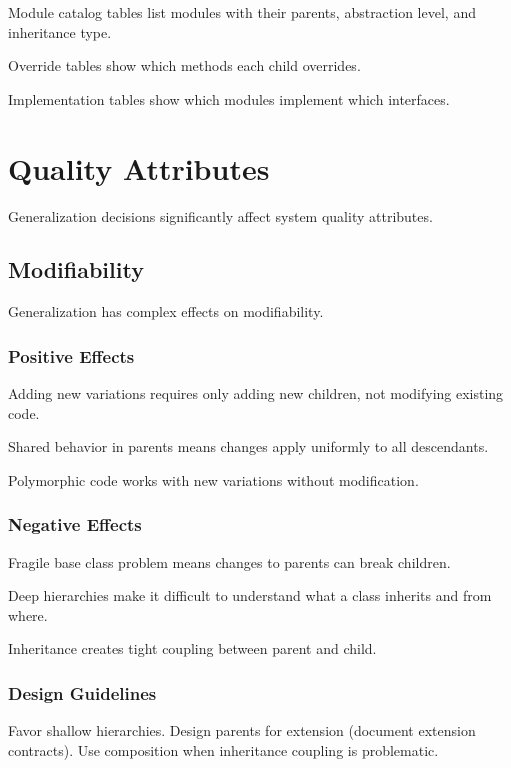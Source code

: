 \documentclass[11pt]{article}
\begin{document}
Module catalog tables list modules with their parents, abstraction level, and inheritance type.

Override tables show which methods each child overrides.

Implementation tables show which modules implement which interfaces.

\section{Quality Attributes}

Generalization decisions significantly affect system quality attributes.

\subsection{Modifiability}

Generalization has complex effects on modifiability.

\subsubsection{Positive Effects}

Adding new variations requires only adding new children, not modifying existing code.

Shared behavior in parents means changes apply uniformly to all descendants.

Polymorphic code works with new variations without modification.

\subsubsection{Negative Effects}

Fragile base class problem means changes to parents can break children.

Deep hierarchies make it difficult to understand what a class inherits and from where.

Inheritance creates tight coupling between parent and child.

\subsubsection{Design Guidelines}

Favor shallow hierarchies. Design parents for extension (document extension contracts). Use composition when inheritance coupling is problematic.
\end{document}
